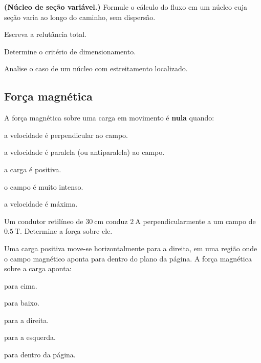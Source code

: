 \begin{questao}[4]{}

\textbf{(Núcleo de seção variável.)} Formule o cálculo do fluxo em um núcleo
cuja seção varia ao longo do caminho, sem dispersão.
\begin{itensq}
\item Escreva a relutância total.
\item Determine o critério de dimensionamento.
\item Analise o caso de um núcleo com estreitamento localizado.
\end{itensq}


\end{questao}


\subsection{Força magnética}

\blocofixacao
\begin{questao}[1]{}

A força magnética sobre uma carga em movimento é \textbf{nula} quando:
\begin{alternativas}
\item a velocidade é perpendicular ao campo.
\item a velocidade é paralela (ou antiparalela) ao campo.
\item a carga é positiva.
\item o campo é muito intenso.
\item a velocidade é máxima.
\end{alternativas}


\end{questao}
\begin{questao}[1]{}

Um condutor retilíneo de $\SI{30}{\centi\meter}$ conduz $\SI{2}{\ampere}$
perpendicularmente a um campo de $\SI{0.5}{\tesla}$. Determine a força sobre ele.


\end{questao}
\begin{questao}[1]{}

Uma carga positiva move-se horizontalmente para a direita, em uma região onde o
campo magnético aponta para dentro do plano da página. A força magnética sobre a
carga aponta:
\begin{alternativas}[2]
\item para cima.
\item para baixo.
\item para a direita.
\item para a esquerda.
\item para dentro da página.
\end{alternativas}


\end{questao}

